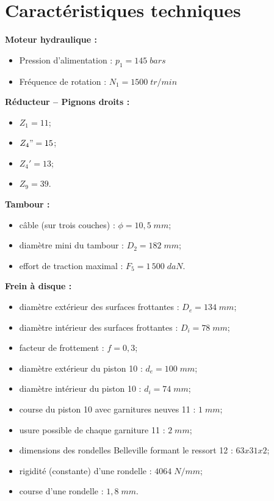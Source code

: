 \documentclass[11pt,oneside]{article}
\begin{document}
\section*{Caractéristiques techniques}

\begin{minipage}[c]{.47\linewidth}

\textbf{Moteur hydraulique :}
\begin{itemize}
\item Pression d'alimentation : $p_1 = 145 \; bars$
\item Fréquence de rotation : $N_1 = 1500 \; tr/min$
\end{itemize}


\textbf{Réducteur -- Pignons droits : }
\begin{itemize}
\item $Z_1 = 11$;
\item $Z_4" = 15$;
\item $Z_4' = 13$;
\item $Z_9 = 39$.
\end{itemize}

\textbf{Tambour : }
\begin{itemize}
\item câble (sur trois couches) : $\phi = 10,5\;mm$;
\item diamètre mini du tambour : $D_2 = 182\; mm$;
\item effort de traction maximal : $F_5 = 1\,500 \; daN$.
\end{itemize}


\end{minipage}\hfill
\begin{minipage}[c]{.47\linewidth}

\textbf{Frein à disque : }
\begin{itemize}
\item diamètre extérieur des surfaces frottantes : $D_e = 134\; mm$;
\item diamètre intérieur des surfaces frottantes : $D_i = 78\; mm$;
\item facteur de frottement : $f = 0,3$;
\item diamètre extérieur du piston 10 : $d_e = 100 \; mm$;
\item diamètre intérieur du piston 10 : $d_i = 74 \;mm$;
\item course du piston 10 avec garnitures neuves 11 : $1 \;mm$;
\item usure possible de chaque garniture 11 : $2\; mm$;
\item dimensions des rondelles Belleville formant le ressort 12 : $63 x 31 x 2$;
\item rigidité (constante) d'une rondelle : $4064 \; N / mm$;
\item course d'une rondelle : $1,8 \; mm$.
\end{itemize}

\end{minipage}
\end{document}
